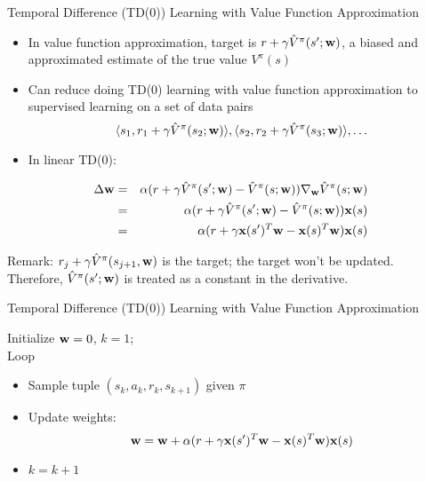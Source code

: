 \documentclass[aspectratio=169]{../latex_main/tntbeamer}  %
\begin{document}
\begin{frame}[c]{Temporal Difference (TD(0)) Learning with Value
		Function Approximation}
	
	\begin{itemize}
		\item In value function approximation, target is $r + \gamma \hat{V}^\pi (s'; \mathbf{w})$, a biased and approximated estimate of the true value $V^\pi(s)$
		\item Can reduce doing TD(0) learning with value function approximation to supervised learning on a set of data pairs
		$$\langle  s_1, r_1+ \gamma \hat{V}^\pi (s_2; \mathbf{w}) \rangle, \langle  s_2, r_2+ \gamma \hat{V}^\pi (s_3; \mathbf{w}) \rangle, \ldots $$
		\item In linear TD(0):
	\end{itemize}
\vspace{-1em}
\begin{eqnarray}
\Delta \mathbf{w} &=& \alpha( r + \gamma \hat{V}^\pi(s'; \mathbf{w}) - \hat{V}^\pi(s;\mathbf{w})) \nabla_{\mathbf{w}} \hat{V}^\pi (s;\mathbf{w})\nonumber\\
&=& \alpha( r + \gamma \hat{V}^\pi(s'; \mathbf{w}) - \hat{V}^\pi(s;\mathbf{w})) \mathbf{x}(s)\nonumber\\
&=& \alpha( r + \gamma \mathbf{x}(s')^T \mathbf{w} - \mathbf{x}(s)^T\mathbf{w}) \mathbf{x}(s)\nonumber
\end{eqnarray}

\alert{Remark:} $r_j + \gamma \hat{V}^\pi(s_{j+1}, \mathbf{w})$ is the target; the target won't be updated.\\  Therefore, $\hat{V}^\pi(s'; \mathbf{w})$ is treated as a constant in the derivative.
\end{frame}
\begin{frame}[c]{Temporal Difference (TD(0)) Learning with Value
		Function Approximation}

Initialize $\mathbf{w}= 0$, $k=1$;\\
Loop
	\begin{itemize}
		\item Sample tuple $(s_k, a_k, r_k, s_{k+1})$ given $\pi$
		\item Update weights:
		$$ \mathbf{w} = \mathbf{w} + \alpha( r + \gamma \mathbf{x}(s')^T \mathbf{w} - \mathbf{x}(s)^T\mathbf{w}) \mathbf{x}(s) $$
		\item $k = k + 1$
	\end{itemize}

\end{frame}
\end{document}
